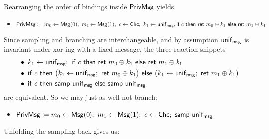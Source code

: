 \noindent Rearranging the order of bindings inside $\mathsf{PrivMsg}$ yields
\begin{itemize}
\item $\mathsf{PrivMsg} \coloneqq m_0 \leftarrow \mathsf{Msg}(0); \ m_1 \leftarrow \mathsf{Msg}(1); \ c \leftarrow \mathsf{Chc}; \ k_1 \leftarrow \mathsf{unif}_{\mathsf{msg}}; \\ \mathsf{if} \ c \ \mathsf{then} \ \mathsf{ret} \ m_0 \oplus k_1 \ \mathsf{else} \ \mathsf{ret} \ m_1 \oplus k_1$
\end{itemize}
Since sampling and branching are interchangeable, and by assumption $\mathsf{unif}_{\mathsf{msg}}$ is invariant under xor-ing with a fixed message, the three reaction snippets
\begin{align*}
& \bullet \; k_1 \leftarrow \mathsf{unif}_{\mathsf{msg}}; \ \mathsf{if} \ c \ \mathsf{then} \ \mathsf{ret} \ m_0 \oplus k_1 \ \mathsf{else} \ \mathsf{ret} \ m_1 \oplus k_1 \\
& \bullet \; \mathsf{if} \ c \ \mathsf{then} \ \big(k_1 \leftarrow \mathsf{unif}_{\mathsf{msg}}; \ \mathsf{ret} \ m_0 \oplus k_1\big) \ \mathsf{else} \ \big(k_1 \leftarrow \mathsf{unif}_{\mathsf{msg}}; \ \mathsf{ret} \ m_1 \oplus k_1\big) \\
& \bullet \; \mathsf{if} \ c \ \mathsf{then} \ \mathsf{samp} \ \mathsf{unif}_{\mathsf{msg}} \ \mathsf{else} \ \mathsf{samp} \ \mathsf{unif}_{\mathsf{msg}}
\end{align*}
are equivalent. So we may just as well not branch:
\begin{itemize}
\item $\PrivMsg \coloneqq m_0 \leftarrow \Msg(0); \ m_1 \leftarrow \Msg(1); \ c \leftarrow \Chc; \ \samp{\unif_\msg}$
\end{itemize}
Unfolding the sampling back gives us:

